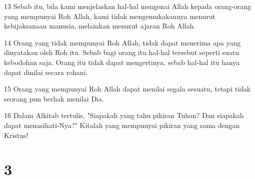 \par 13 Sebab itu, bila kami menjelaskan hal-hal mengenai Allah kepada orang-orang yang mempunyai Roh Allah, kami tidak mengemukakannya menurut kebijaksanaan manusia, melainkan menurut ajaran Roh Allah.
\par 14 Orang yang tidak mempunyai Roh Allah, tidak dapat menerima apa yang dinyatakan oleh Roh itu. Sebab bagi orang itu hal-hal tersebut seperti suatu kebodohan saja. Orang itu tidak dapat mengertinya, sebab hal-hal itu hanya dapat dinilai secara rohani.
\par 15 Orang yang mempunyai Roh Allah dapat menilai segala sesuatu, tetapi tidak seorang pun berhak menilai Dia.
\par 16 Dalam Alkitab tertulis, "Siapakah yang tahu pikiran Tuhan? Dan siapakah dapat menasihati-Nya?" Kitalah yang mempunyai pikiran yang sama dengan Kristus!

\chapter{3}

